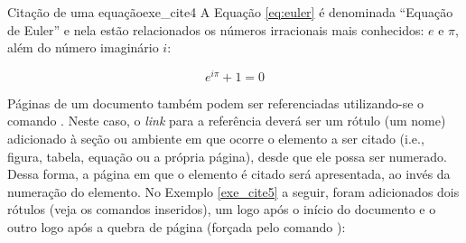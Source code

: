 \begin{texexptitled}[breakable,enhanced,middle=2mm]{Citação de uma equação}{exe_cite4}
A Equação \ref{eq:euler} é denominada ``Equação de Euler'' e nela estão relacionados os números irracionais mais conhecidos: $e$ e $\pi$, além do número imaginário $i$:

\begin{equation}
  \label{eq:euler}
  e^{i\pi} + 1 = 0
\end{equation}

\end{texexptitled}

Páginas de um documento também podem ser referenciadas utilizando-se o comando \texttt{\pageref{nome}}. Neste caso, o \textit{link} para a referência deverá ser um rótulo (um nome) adicionado à seção ou ambiente em que ocorre o elemento a ser citado (i.e., figura, tabela, equação ou a própria página), desde que ele possa ser numerado. Dessa forma, a página em que o elemento é citado será apresentada, ao invés da numeração do elemento. No Exemplo \ref{exe_cite5} a seguir, foram adicionados dois rótulos (veja os comandos  inseridos), um logo após o início do documento e o outro logo após a quebra de página (forçada pelo comando \texttt{\clearpage}):


